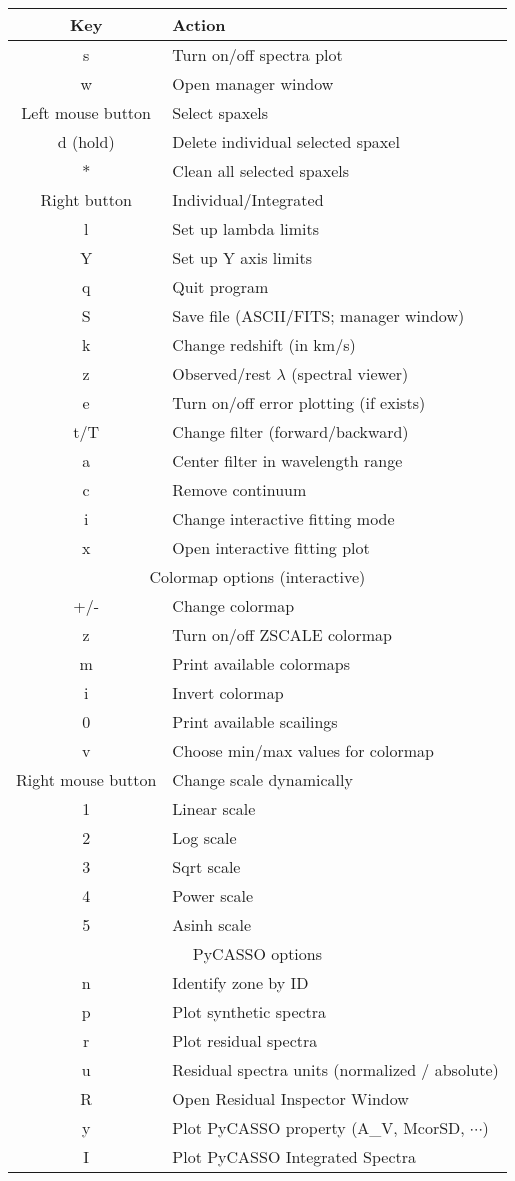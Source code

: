 \documentclass[12pt]{article}
\begin{document}
\centering
\setlength{\tabcolsep}{1cm}
\begin{tabular} {c l}
\hline
\rowcolor{MilkTea!25!white}
Key & Action \\
\hline
s & Turn on/off spectra plot\\
w & Open manager window \\
Left mouse button & Select spaxels \\
d (hold) & Delete individual selected spaxel \\
$*$ & Clean all selected spaxels\\
Right button & Individual/Integrated \\
l & Set up lambda limits\\
Y & Set up Y axis limits\\
q & Quit program\\
S & Save file (ASCII/FITS; manager window) \\
k & Change redshift (in km/s) \\
z & Observed/rest $\lambda$ (spectral viewer) \\
e & Turn on/off error plotting (if exists) \\
t/T &  Change filter (forward/backward) \\
a & Center filter in wavelength range \\
c & Remove continuum \\
i & Change interactive fitting mode \\
x & Open interactive fitting plot \\
\multicolumn{2}{c}{\cellcolor{MilkTea!25!white} Colormap options (interactive)} \\
+/- & Change colormap \\
z & Turn on/off ZSCALE colormap\\
m & Print available colormaps \\
i & Invert colormap \\
0 & Print available scailings \\
v & Choose min/max values for colormap \\
Right mouse button & Change scale dynamically\\
1 & Linear scale \\
2 & Log scale \\
3 & Sqrt scale \\
4 & Power scale \\
5 & Asinh scale \\
\multicolumn{2}{c}{\cellcolor{MilkTea!25!white} PyCASSO options} \\
n & Identify zone by ID \\
p & Plot synthetic spectra \\
r & Plot residual spectra \\
u & Residual spectra units (normalized / absolute)\\
R & Open Residual Inspector Window\\
y & Plot PyCASSO property (A\_V, McorSD, $\cdots$) \\
I & Plot PyCASSO Integrated Spectra \\
\hline
\end{tabular}
\end{document}

